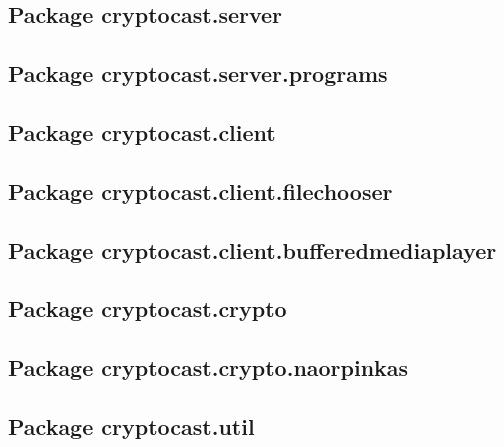 \documentclass[a4paper,10pt]{scrartcl}
\begin{document}
\subsection{Package cryptocast.server}
\subsection{Package cryptocast.server.programs}
\subsection{Package cryptocast.client}
\subsection{Package cryptocast.client.filechooser}
\subsection{Package cryptocast.client.bufferedmediaplayer}
\subsection{Package cryptocast.crypto}
\subsection{Package cryptocast.crypto.naorpinkas}
\subsection{Package cryptocast.util}
\end{document}
